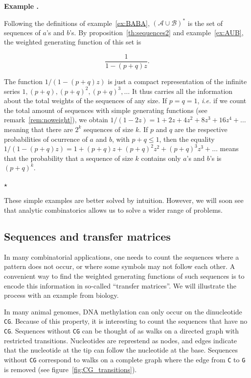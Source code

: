 \documentclass{article}
\newcounter{examplecounter}
\newenvironment{example}
{\small\vspace{0.5\baselineskip}
  \refstepcounter{examplecounter}%
  \noindent\textbf{Example \arabic{examplecounter}.}%
}{\vspace{-0.2\baselineskip}\begin{center}%
  $\star$\end{center}\vspace{0.5\baselineskip}}
\begin{document}
\begin{example}
\label{ex:AUB+}
Following the definitions of example~\ref{ex:BABA}, $(\mathcal{A} \cup
\mathcal{B})^*$ is the set of sequences of $a$'s and $b$'s. By
proposition~\ref{th:sequences2} and example~\ref{ex:AUB}, the weighted
generating function of this set is

\begin{equation*}
\frac{1}{1-(p+q)z}.
\end{equation*}

The function $1 / (1-(p+q)z)$ is just a compact representation of the
infinite series $1, (p+q), (p+q)^2, (p+q)^3, \ldots$ It thus carries all
the information about the total weights of the sequences of any size. If
$p = q = 1$, \textit{i.e.} if we count the total amount of sequences with
simple generating functions (see remark~\ref{rem:noweight}), we obtain
$1/(1-2z) = 1+ 2z + 4z^2 + 8z^3 + 16z^4 + \ldots$ meaning that there are
$2^k$ sequences of size $k$. If $p$ and $q$ are the respective
probabilities of ocurrence of $a$ and $b$, with $p + q \leq 1$, then the
equality $1 / (1-(p+q)z) = 1+ (p+q)z + (p+q)^2z^2 + (p+q)^3z^3 + \ldots$
means that the probability that a sequence of size $k$ contains only $a$'s
and $b$'s is $(p+q)^k$.
\end{example}

These simple examples are better solved by intuition. However, we will
soon see that analytic combinatorics allows us to solve a wider range of
problems.





\subsection{Sequences and transfer matrices}
\label{subsec:TransMat}

In many combinatorial applications, one needs to count the sequences where
a pattern does not occur, or where some symbols may not follow each other.
A convenient way to find the weighted generating functions of such
sequences is to encode this information in so-called ``transfer
matrices''. We will illustrate the process with an example from biology.

In many animal genomes, DNA methylation can only occur on the dinucleotide
\texttt{CG}. Because of this property, it is interesting to count the
sequences that have no \texttt{CG}. Sequences without \texttt{CG} can be
thought of as walks on a directed graph with restricted transitions.
Nucleotides are represtend as nodes, and edges indicate that the
nucleotide at the tip can follow the nucleotide at the base. Sequences
without \texttt{CG} correspond to walks on a complete graph where the edge
from \texttt{C} to \texttt{G} is removed (see
figure~\ref{fig:CG_transitions}).
\end{document}
